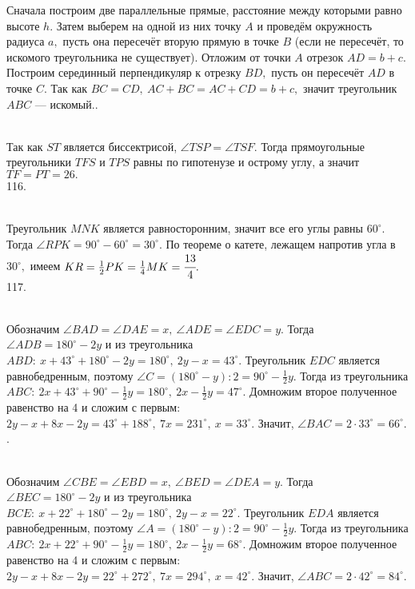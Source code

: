 Сначала построим две параллельные прямые, расстояние между которыми равно высоте $h.$ Затем выберем на одной из них точку $A$ и проведём окружность радиуса $a,$ пусть она пересечёт вторую прямую в точке $B$ (если не пересечёт, то искомого треугольника не существует). Отложим от точки $A$ отрезок $AD=b+c.$ Построим серединный перпендикуляр к отрезку $BD,$ пусть он пересечёт $AD$ в точке $C.$ Так как $BC=CD,\ AC+BC=AC+CD=b+c,$ значит треугольник $ABC$ --- искомый.\newpage{}. \begin{figure}[ht!]
\end{figure}\\
Так как $ST$ является биссектрисой, $\angle TSP=\angle TSF.$ Тогда прямоугольные треугольники $TFS$ и $TPS$ равны по гипотенузе и острому углу, а значит $TF=PT=26.$\\
116. \begin{figure}[ht!]
\end{figure}\\
Треугольник $MNK$ является равносторонним, значит все его углы равны $60^\circ.$ Тогда $\angle RPK=90^\circ-60^\circ=30^\circ.$ По теореме о катете, лежащем напротив угла в $30^\circ,$ имеем $KR=\frac{1}{2}PK=\frac{1}{4}MK=\cfrac{13}{4}.$\\
117. \begin{figure}[ht!]
\end{figure}\\
Обозначим $\angle BAD=\angle DAE=x,\ \angle ADE=\angle EDC=y.$ Тогда $\angle ADB=180^\circ-2y$ и из треугольника $ABD:\ x+43^\circ+180^\circ-2y=180^\circ,\ 2y-x=43^\circ.$ Треугольник $EDC$ является равнобедренным, поэтому $\angle C=(180^\circ-y):2=90^\circ-\frac{1}{2}y.$ Тогда из треугольника $ABC:\ 2x+43^\circ+90^\circ-\frac{1}{2}y=180^\circ,\ 2x-\frac{1}{2}y=47^\circ.$ Домножим второе полученное равенство на 4 и сложим с первым: $2y-x+8x-2y=43^\circ+188^\circ,\ 7x=231^\circ,\ x=33^\circ.$ Значит, $\angle BAC=2\cdot33^\circ=66^\circ.$\newpage{}.\begin{figure}[ht!]
\end{figure}\\
Обозначим $\angle CBE=\angle EBD=x,\ \angle BED=\angle DEA=y.$ Тогда $\angle BEC=180^\circ-2y$ и из треугольника $BCE:\ x+22^\circ+180^\circ-2y=180^\circ,\ 2y-x=22^\circ.$ Треугольник $EDA$ является равнобедренным, поэтому $\angle A=(180^\circ-y):2=90^\circ-\frac{1}{2}y.$ Тогда из треугольника $ABC:\ 2x+22^\circ+90^\circ-\frac{1}{2}y=180^\circ,\ 2x-\frac{1}{2}y=68^\circ.$ Домножим второе полученное равенство на 4 и сложим с первым: $2y-x+8x-2y=22^\circ+272^\circ,\ 7x=294^\circ,\ x=42^\circ.$ Значит, $\angle ABC=2\cdot42^\circ=84^\circ.$\\
